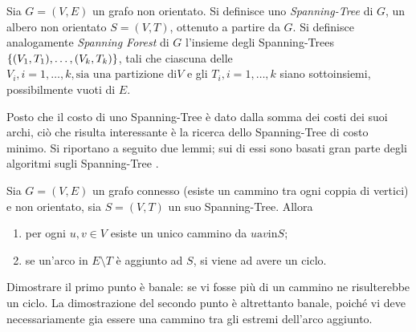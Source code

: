 \documentclass{subfiles}
\begin{document}
\begin{Definition*}
    Sia \(G = (V, E)\) un grafo non orientato. Si definisce uno \emph{Spanning-Tree} di \(G\), un albero non orientato \(S = (V, T)\), ottenuto a partire da \(G\).
    Si definisce analogamente \emph{Spanning Forest} di \(G\) l'insieme degli Spanning-Trees \(\left\{(V_{1}, T_{1}), \ldots, (V_{k}, T_{k})\right\}\),
    tali che ciascuna delle \(V_{i}, i = 1, \ldots, k, \text{sia una partizione di} V\) e gli \(T_{i}, i = 1, \ldots, k\) siano sottoinsiemi, possibilmente vuoti di \(E\).
\end{Definition*}

\noindent Posto che il costo di uno Spanning-Tree è dato dalla somma dei costi dei suoi archi, ciò che risulta interessante è la ricerca dello Spanning-Tree di costo minimo.
Si riportano a seguito due lemmi; sui di essi sono basati gran parte degli algoritmi sugli Spanning-Tree .

\begin{Lemma}\label{Lemma:6.1}
    Sia \(G = (V, E)\) un grafo connesso (esiste un cammino tra ogni coppia di vertici) e non orientato, sia \(S = (V, T)\) un suo Spanning-Tree. Allora
    \begin{enumerate}
        \item per ogni \(u, v \in V\) esiste un unico cammino da \(u \text{a} v \text{in} S\);
        \item se un'arco in \(E \setminus T\) è aggiunto ad \(S\), si viene ad avere un ciclo.
    \end{enumerate}

    \begin{Proof*}
        Dimostrare il primo punto è banale: se vi fosse più di un cammino ne risulterebbe un ciclo.
        La dimostrazione del secondo punto è altrettanto banale, poiché vi deve necessariamente gia essere una cammino tra gli estremi dell'arco aggiunto.
    \end{Proof*}
\end{Lemma}
\end{document}
